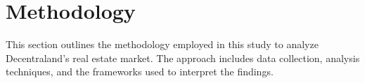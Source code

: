 \section{Methodology}
This section outlines the methodology employed in this study to analyze Decentraland's real estate market. The approach includes data collection, analysis techniques, and the frameworks used to interpret the findings.